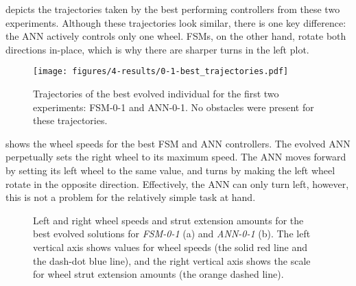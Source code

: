  depicts the trajectories taken by the best performing controllers from these two experiments.
%
Although these trajectories look similar, there is one key difference: the ANN actively controls only one wheel. FSMs, on the other hand, rotate both directions in-place, which is why there are sharper turns in the left plot.


\begin{figure}[!ht]
    \centering

    \texttt{[image: figures/4-results/0-1-best\_trajectories.pdf]}


    \caption{Trajectories of the best evolved individual for the first two experiments: FSM-0-1 and ANN-0-1. No obstacles were present for these trajectories.}
    \label{fig:0-1-best-trajectories}

\end{figure}


 shows the wheel speeds for the best FSM and ANN controllers.
%
The evolved ANN perpetually sets the right wheel to its maximum speed.
%
The ANN moves forward by setting its left wheel to the same value, and turns by making the left wheel rotate in the opposite direction.
%
Effectively, the ANN can only turn left, however, this is not a problem for the relatively simple task at hand.



\begin{figure}[!ht]
    \centering





    \caption{Left and right wheel speeds and strut extension amounts for the best evolved solutions for \emph{FSM-0-1} (a) and \emph{ANN-0-1} (b). The left vertical axis shows values for wheel speeds (the solid red line and the dash-dot blue line), and the right vertical axis shows the scale for wheel strut extension amounts (the orange dashed line). }
    \label{fig:ANN-0-1-best-speed}

\end{figure}


